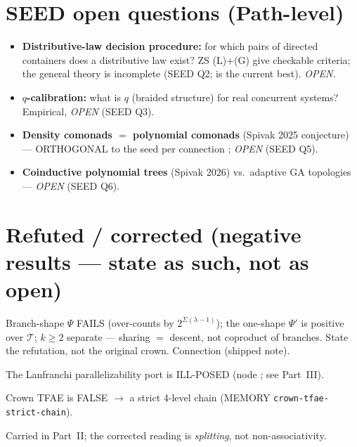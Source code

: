 \documentclass[11pt]{article}
\begin{document}
\section{SEED open questions (Path-level)}
\begin{itemize}[leftmargin=1.4em]
\item \textbf{Distributive-law decision procedure:} for which pairs of directed containers does a
distributive law exist? ZS (L)$+$(G) give checkable criteria; the general theory is incomplete
(SEED Q2;  is the current best). \emph{OPEN.}
\item \textbf{$q$-calibration:} what is $q$ (braided structure) for real concurrent systems?
Empirical, \emph{OPEN} (SEED Q3).
\item \textbf{Density comonads $=$ polynomial comonads} (Spivak 2025 conjecture) --- ORTHOGONAL to
the seed per connection ; \emph{OPEN} (SEED Q5).
\item \textbf{Coinductive polynomial trees} (Spivak 2026) vs.\ adaptive GA topologies --- \emph{OPEN}
(SEED Q6).
\end{itemize}

\section{Refuted / corrected (negative results --- state as such, not as open)}
\begin{result}
Branch-shape $Ψ$ FAILS (over-counts by $2^{Σ(λ-1)}$); the one-shape $Ψ'$ is positive over $𝒯$;
$k\geq2$ separate --- sharing $=$ descent, not coproduct of branches. State the refutation, not the
original crown. Connection  (shipped note).
\end{result}

\begin{result}
The Lanfranchi parallelizability port is ILL-POSED (node ;
see Part~III).
\end{result}

\begin{result}
Crown TFAE is FALSE $\to$ a strict 4-level chain (MEMORY \texttt{crown-tfae-strict-chain}).
\end{result}

\begin{result}
Carried in Part~II; the corrected reading is \emph{splitting}, not non-associativity.
\end{result}
\end{document}
